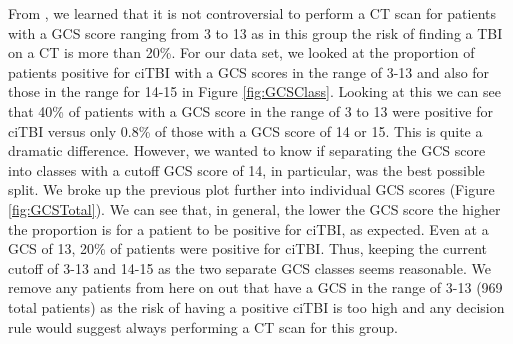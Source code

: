 \documentclass[11pt, letterpaper]{amsart}
\begin{document}
From \cite{kuppermann2009identification}, we learned that it is not controversial to perform a CT scan for patients with a GCS score ranging from 3 to 13 as in this group the risk of finding a TBI on a CT is more than 20\%. For our data set, we looked at the proportion of patients positive for ciTBI with a GCS scores in the range of 3-13 and also for those in the range for 14-15 in Figure \ref{fig:GCSClass}. Looking at this we can see that 40\% of patients with a GCS score in the range of 3 to 13 were positive for ciTBI versus only 0.8\% of those with a GCS score of 14 or 15. This is quite a dramatic difference. However, we wanted to know if separating the GCS score into classes with a cutoff GCS score of 14, in particular, was the best possible split. We broke up the previous plot further into individual GCS scores (Figure \ref{fig:GCSTotal}). We can see that, in general, the lower the GCS score the higher the proportion is for a patient to be positive for ciTBI, as expected. Even at a GCS of 13, 20\% of patients were positive for ciTBI. Thus, keeping the current cutoff of 3-13 and 14-15 as the two separate GCS classes seems reasonable. We remove any patients from here on out that have a GCS in the range of 3-13 (969 total patients) as the risk of having a positive ciTBI is too high and any decision rule would suggest always performing a CT scan for this group.
\end{document}
